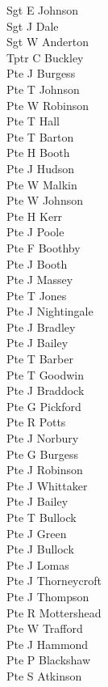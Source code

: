\begin{multicols}{3}
  \small
  \noindent
  Sgt E Johnson \\
  Sgt J Dale \\
  Sgt W Anderton \\
  Tptr C Buckley \\
  Pte J Burgess \\
  Pte T Johnson \\
  Pte W Robinson \\
  Pte T Hall \\
  Pte T Barton \\
  Pte H Booth \\
  Pte J Hudson \\
  Pte W Malkin \\
  Pte W Johnson \\
  Pte H Kerr \\
  Pte J Poole \\
  Pte F Boothby \\
  Pte J Booth \\
  Pte J Massey \\
  Pte T Jones \\
  Pte J Nightingale \\
  Pte J Bradley \\
  Pte J Bailey \\
  Pte T Barber \\
  Pte T Goodwin \\
  Pte J Braddock \\
  Pte G Pickford \\
  Pte R Potts \\
  Pte J Norbury \\
  Pte G Burgess \\
  Pte J Robinson \\
  Pte J Whittaker \\
  Pte J Bailey \\
  Pte T Bullock \\
  Pte J Green \\
  Pte J Bullock \\
  Pte J Lomas \\
  Pte J Thorneycroft \\
  Pte J Thompson \\
  Pte R Mottershead \\
  Pte W Trafford \\
  Pte J Hammond \\
  Pte P Blackshaw \\
  Pte S Atkinson \\

\end{multicols}

